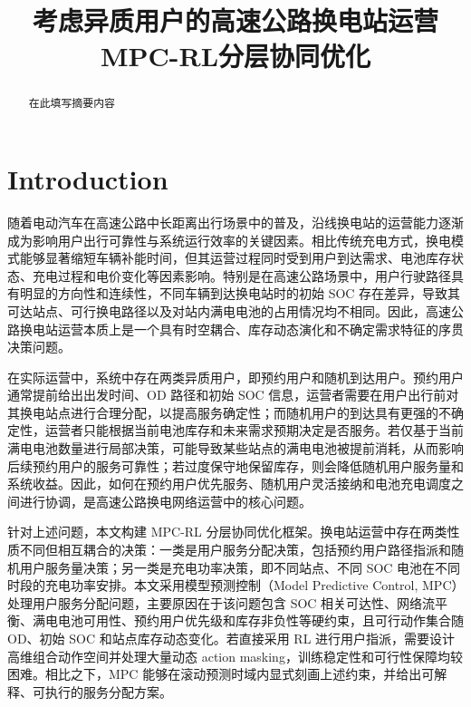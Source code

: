 \documentclass[12pt,hyperref,a4paper,UTF8]{ctexart}
\begin{document}
\cover

\newpage
\begin{abstract}

在此填写摘要内容

\end{abstract}
\newpage

\thispagestyle{empty} %

\newpage
\tableofcontents

\newpage

\begin{center}
   \title{ \Huge \textbf{{考虑异质用户的高速公路换电站运营MPC-RL分层协同优化}}}
\end{center}



\section{Introduction}
随着电动汽车在高速公路中长距离出行场景中的普及，沿线换电站的运营能力逐渐成为影响用户出行可靠性与系统运行效率的关键因素。相比传统充电方式，换电模式能够显著缩短车辆补能时间，但其运营过程同时受到用户到达需求、电池库存状态、充电过程和电价变化等因素影响。特别是在高速公路场景中，用户行驶路径具有明显的方向性和连续性，不同车辆到达换电站时的初始 SOC 存在差异，导致其可达站点、可行换电路径以及对站内满电电池的占用情况均不相同。因此，高速公路换电站运营本质上是一个具有时空耦合、库存动态演化和不确定需求特征的序贯决策问题。

在实际运营中，系统中存在两类异质用户，即预约用户和随机到达用户。预约用户通常提前给出出发时间、OD 路径和初始 SOC 信息，运营者需要在用户出行前对其换电站点进行合理分配，以提高服务确定性；而随机用户的到达具有更强的不确定性，运营者只能根据当前电池库存和未来需求预期决定是否服务。若仅基于当前满电电池数量进行局部决策，可能导致某些站点的满电电池被提前消耗，从而影响后续预约用户的服务可靠性；若过度保守地保留库存，则会降低随机用户服务量和系统收益。因此，如何在预约用户优先服务、随机用户灵活接纳和电池充电调度之间进行协调，是高速公路换电网络运营中的核心问题。

针对上述问题，本文构建 MPC-RL 分层协同优化框架。换电站运营中存在两类性质不同但相互耦合的决策：一类是用户服务分配决策，包括预约用户路径指派和随机用户服务量决策；另一类是充电功率决策，即不同站点、不同 SOC 电池在不同时段的充电功率安排。本文采用模型预测控制（Model Predictive Control, MPC）处理用户服务分配问题，主要原因在于该问题包含 SOC 相关可达性、网络流平衡、满电电池可用性、预约用户优先级和库存非负性等硬约束，且可行动作集合随 OD、初始 SOC 和站点库存动态变化。若直接采用 RL 进行用户指派，需要设计高维组合动作空间并处理大量动态 action masking，训练稳定性和可行性保障均较困难。相比之下，MPC 能够在滚动预测时域内显式刻画上述约束，并给出可解释、可执行的服务分配方案。
\end{document}
